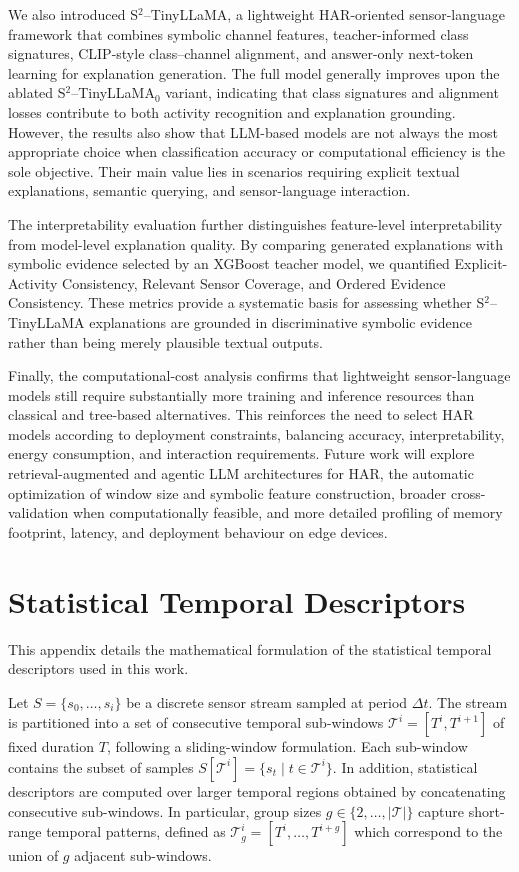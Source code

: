 \documentclass[preprint,12pt]{elsarticle}
\begin{document}
We also introduced S$^2$--TinyLLaMA, a lightweight HAR-oriented sensor-language framework that combines symbolic channel features, teacher-informed class signatures, CLIP-style class--channel alignment, and answer-only next-token learning for explanation generation. The full model generally improves upon the ablated S$^2$--TinyLLaMA$_0$ variant, indicating that class signatures and alignment losses contribute to both activity recognition and explanation grounding. However, the results also show that LLM-based models are not always the most appropriate choice when classification accuracy or computational efficiency is the sole objective. Their main value lies in scenarios requiring explicit textual explanations, semantic querying, and sensor-language interaction.

The interpretability evaluation further distinguishes feature-level interpretability from model-level explanation quality. By comparing generated explanations with symbolic evidence selected by an XGBoost teacher model, we quantified Explicit-Activity Consistency, Relevant Sensor Coverage, and Ordered Evidence Consistency. These metrics provide a systematic basis for assessing whether S$^2$--TinyLLaMA explanations are grounded in discriminative symbolic evidence rather than being merely plausible textual outputs.

Finally, the computational-cost analysis confirms that lightweight sensor-language models still require substantially more training and inference resources than classical and tree-based alternatives. This reinforces the need to select HAR models according to deployment constraints, balancing accuracy, interpretability, energy consumption, and interaction requirements. Future work will explore retrieval-augmented and agentic LLM architectures for HAR, the automatic optimization of window size and symbolic feature construction, broader cross-validation when computationally feasible, and more detailed profiling of memory footprint, latency, and deployment behaviour on edge devices.



\appendix
\section{Statistical Temporal Descriptors}
\label{app:statistical_descriptors}

This appendix details the mathematical formulation of the statistical temporal descriptors used in this work.

Let $S=\{s_0,\ldots,s_i\}$ be a discrete sensor stream sampled at period $\Delta t$. The stream is partitioned into a set of consecutive temporal sub-windows $\mathcal{T}^i = [T^i, T^{i+1}]$ of fixed duration $T$, following a
sliding-window formulation. Each sub-window contains the subset of samples $S[\mathcal{T}^i] = \{s_t \mid t \in \mathcal{T}^i\}$. In addition, statistical descriptors are computed over larger temporal regions obtained by concatenating consecutive sub-windows. In particular, group sizes $g \in \{2,\ldots,|\mathcal{T}|\}$ capture short-range temporal patterns, defined as $\mathcal{T}^i_g = [T^{i}, \ldots, T^{i+g}]$ which correspond to the union of $g$ adjacent sub-windows.
\end{document}
